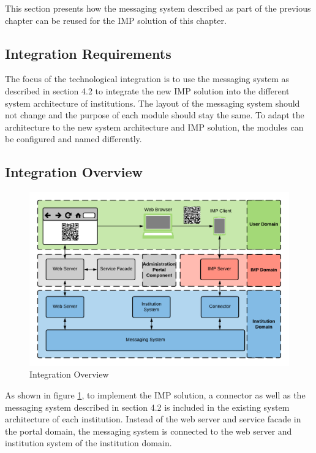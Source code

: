 This section presents how the messaging system described as part of the previous chapter can be reused for the IMP solution of this chapter.

\subsection{Integration Requirements}

The focus of the technological integration is to use the messaging system as described in section 4.2 to integrate the new IMP solution into the different system architecture of institutions. The layout of the messaging system should not change and the purpose of each module should stay the same. To adapt the architecture to the new system architecture and IMP solution, the modules can be configured and named differently.

\subsection{Integration Overview}

\begin{figure}[H]
    \centering
    \includegraphics[scale=0.6]{Diagrams/Integration Architecture 2/Technological Integration/1. Integration Overview.pdf}
    \caption{Integration Overview}
    \label{integration2:integration_overview}
\end{figure}

As shown in figure \ref{integration2:integration_overview}, to implement the IMP solution, a connector as well as the messaging system described in section 4.2 is included in the existing system architecture of each institution. Instead of the web server and service facade in the portal domain, the messaging system is connected to the web server and institution system of the institution domain.

